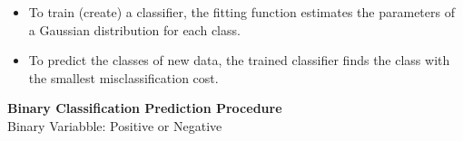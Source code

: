 \documentclass[]{report}
\begin{document}
\begin{itemize}
\item  To train (create) a classifier, the fitting function estimates the parameters
of a Gaussian distribution for each class.
\item  To predict the classes of new data, the trained classifier finds the class
with the smallest misclassification cost.
\end{itemize}


%



\noindent \textbf{Binary Classification Prediction Procedure}\\
Binary Variabble: Positive or Negative 

\end{document}
